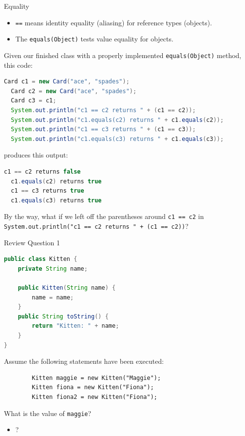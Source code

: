 \documentclass{beamer}
\begin{document}
\begin{frame}[fragile]{Equality}
\vspace{-.05in}
\begin{itemize}
\item {\tt ==} means identity equality (aliasing) for reference types (objects).
\item The {\tt equals(Object)} tests value equality for objects.
\end{itemize}

Given our finished  class with a properly implemented {\tt equals(Object)} method, this code:
\vspace{-.05in}
\begin{lstlisting}[language=Java]
  Card c1 = new Card("ace", "spades");
  Card c2 = new Card("ace", "spades");
  Card c3 = c1;
  System.out.println("c1 == c2 returns " + (c1 == c2));
  System.out.println("c1.equals(c2) returns " + c1.equals(c2));
  System.out.println("c1 == c3 returns " + (c1 == c3));
  System.out.println("c1.equals(c3) returns " + c1.equals(c3));
\end{lstlisting}
\vspace{-.05in}
produces this output:
\vspace{-.05in}
\begin{lstlisting}[language=Java]
  c1 == c2 returns false
  c1.equals(c2) returns true
  c1 == c3 returns true
  c1.equals(c3) returns true
\end{lstlisting}
\vspace{-.05in}
{\small By the way, what if we left off the parentheses around {\tt c1 == c2} in  {\tt System.out.println("c1 == c2 returns " + (c1 == c2))}}?
\end{frame}


\begin{frame}[fragile]{Review Question 1}
\vspace{-.05in}
\begin{lstlisting}[language=Java]
public class Kitten {
    private String name;

    public Kitten(String name) {
        name = name;
    }
    public String toString() {
        return "Kitten: " + name;
    }
}
\end{lstlisting}
\vspace{-.05in}
Assume the following statements have been executed:
\vspace{-.05in}
\begin{lstlisting}
        Kitten maggie = new Kitten("Maggie");
        Kitten fiona = new Kitten("Fiona");
        Kitten fiona2 = new Kitten("Fiona");
\end{lstlisting}
\vspace{-.05in}
What is the value of {\tt maggie}?
\begin{itemize}
\itemsep0em
\item ?
\end{itemize}
\end{frame}
\end{document}
